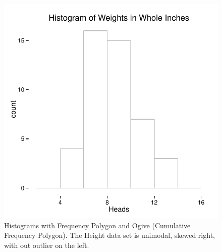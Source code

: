 \documentclass[nohyper,justified]{tufte-handout}\usepackage[]{graphicx}\usepackage[]{color}
\makeatletter
\def\maxwidth{ %
  \ifdim\Gin@nat@width>\linewidth
    \linewidth
  \else
    \Gin@nat@width
  \fi
}
\newenvironment{knitrout}{}{} %
\makeatother
\begin{document}
\begin{knitrout}
\color{fgcolor}\begin{figure}

{\centering \includegraphics[width=\maxwidth]{figure/graphics-histogram2bin-1} 

}

\caption[Histograms with Frequency Polygon and Ogive (Cumulative Frequency Polygon)]{Histograms with Frequency Polygon and Ogive (Cumulative Frequency Polygon). The Height data set is unimodal, skewed right, with out outlier on the left. }\label{fig:histogram2bin1}
\end{figure}

\begin{figure}


\end{figure}
\end{knitrout}
\end{document}
